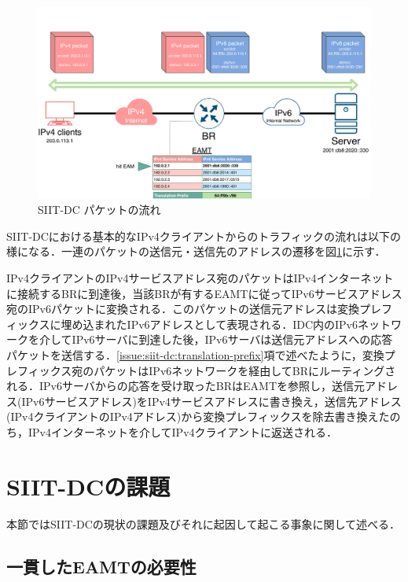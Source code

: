 \begin{figure}[h]
    \begin{center}
      \includegraphics[width=14cm,pagebox=cropbox,clip]{img/siit-dc_packet.pdf}
    \end{center}
    \caption{SIIT-DC パケットの流れ}
    \label{fig:siit-dc_packet}
\end{figure}

SIIT-DCにおける基本的なIPv4クライアントからのトラフィックの流れは以下の様になる．一連のパケットの送信元・送信先のアドレスの遷移を図\ref{fig:siit-dc_packet}に示す．

IPv4クライアントのIPv4サービスアドレス宛のパケットはIPv4インターネットに接続するBRに到達後，当該BRが有するEAMTに従ってIPv6サービスアドレス宛のIPv6パケットに変換される．このパケットの送信元アドレスは変換プレフィックスに埋め込まれたIPv6アドレスとして表現される．IDC内のIPv6ネットワークを介してIPv6サーバに到達した後，IPv6サーバは送信元アドレスへの応答パケットを送信する．\ref{issue:siit-dc:translation-prefix}項で述べたように，変換プレフィックス宛のパケットはIPv6ネットワークを経由してBRにルーティングされる．IPv6サーバからの応答を受け取ったBRはEAMTを参照し，送信元アドレス(IPv6サービスアドレス)をIPv4サービスアドレスに書き換え，送信先アドレス(IPv4クライアントのIPv4アドレス)から変換プレフィックスを除去書き換えたのち，IPv4インターネットを介してIPv4クライアントに返送される．




\section{SIIT-DCの課題}
\label{issue:siit-dc_problems}
本節ではSIIT-DCの現状の課題及びそれに起因して起こる事象に関して述べる．

\subsection{一貫したEAMTの必要性}
\label{issue:siit-dc_problems:consistent}

